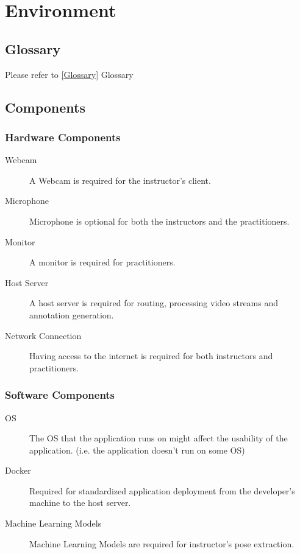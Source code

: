 \documentclass[12pt]{article}
\begin{document}
\section{Environment}
\subsection{Glossary}
Please refer to \ref*{Glossary} Glossary

\subsection{Components}

\subsubsection{Hardware Components}
\begin{description}
    \item[Webcam] A Webcam is required for the instructor's client.
    \item[Microphone] Microphone is optional for both the instructors and the practitioners.
    \item[Monitor] A monitor is required for practitioners.
    \item[Host Server] A host server is required for routing, processing video streams and annotation generation.
    \item[Network Connection] Having access to the internet is required for both instructors and practitioners.
\end{description}
\subsubsection{Software Components}
\begin{description}
    \item[OS] The OS that the application runs on might affect the usability of the application. (i.e. the application doesn’t run on some OS)
    \item[Docker] Required for standardized application deployment from the developer’s machine to the host server.
    \item[Machine Learning Models] Machine Learning Models are required for instructor’s pose extraction.
\end{description}
\end{document}
